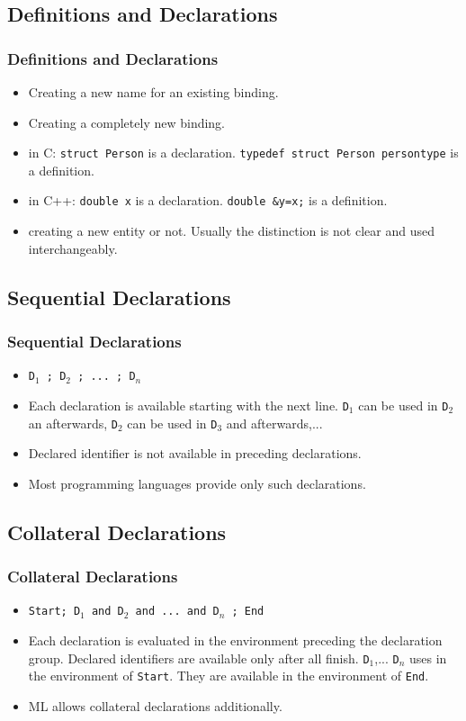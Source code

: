 \subsection{Definitions and Declarations}
\begin{frame}
\frametitle{Definitions and Declarations}
\begin{itemize}
 \item {} Creating a new name for an existing binding.
 \item {} Creating a completely new binding.
 \item in C: \texttt{struct Person} is a declaration. \texttt{typedef struct Person persontype}
 is a definition.
 \item in C++: \texttt{double x} is a declaration. \texttt{double \&y=x;} is a definition.
 \item creating a new entity or not. Usually the distinction is not clear and used
 interchangeably.
\end{itemize}
\end{frame}

\subsection{Sequential Declarations}
\begin{frame}
\frametitle{Sequential Declarations}
\begin{itemize}
 \item \texttt{D$_1$ ; D$_2$ ; ... ; D$_n$}
 \item Each declaration is available starting with the next line. \texttt{D$_1$} can be used in
 \texttt{D$_2$} an afterwards,  \texttt{D$_2$} can be used in \texttt{D$_3$} and afterwards,...
 \item Declared identifier is not available in preceding declarations.
 \item Most programming languages provide only such declarations.
\end{itemize}
\end{frame}

\subsection{Collateral Declarations}
\begin{frame}
\frametitle{Collateral Declarations}
\begin{itemize}
 \item \texttt{Start; D$_1$ and D$_2$ and ...  and D$_n$ ; End}
 \item Each declaration is evaluated in the environment preceding the declaration group.
 Declared identifiers are available only after all finish.
\texttt{D$_1$},... \texttt{D$_n$} uses in the environment of \texttt{Start}. They are 
available in the environment of \texttt{End}.
 \item ML allows collateral declarations additionally.
\end{itemize}
\end{frame}

